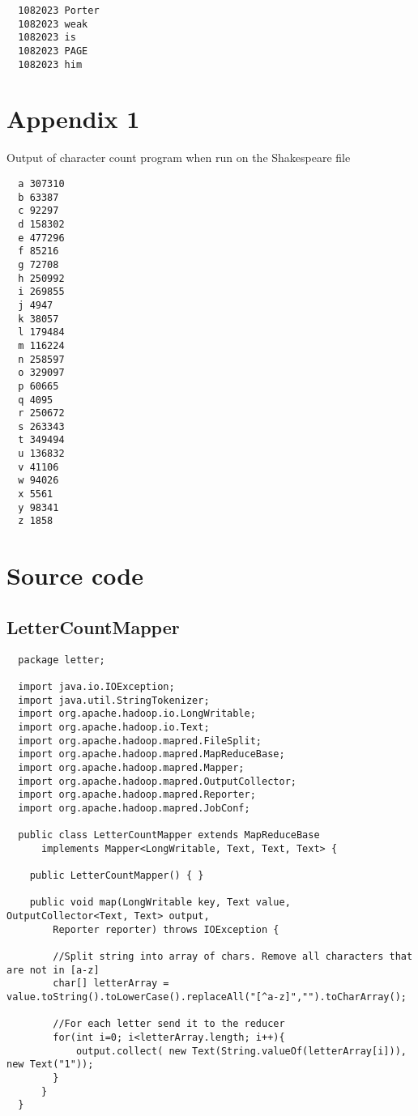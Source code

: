 \documentclass[10pt, a4paper]{article}
\begin{document}
\begin{verbatim}
  1082023 Porter
  1082023 weak
  1082023 is
  1082023 PAGE
  1082023 him
\end{verbatim}


\newpage
\section*{Appendix 1} %
\label{sec:appendix_1}
Output of character count program when run on the Shakespeare file
\begin{verbatim}
  a	307310
  b	63387
  c	92297
  d	158302
  e	477296
  f	85216
  g	72708
  h	250992
  i	269855
  j	4947
  k	38057
  l	179484
  m	116224
  n	258597
  o	329097
  p	60665
  q	4095
  r	250672
  s	263343
  t	349494
  u	136832
  v	41106
  w	94026
  x	5561
  y	98341
  z	1858
\end{verbatim}


\newpage
\section{Source code} %

\subsection{LetterCountMapper} %
\label{sub:lettercountmapper}
\begin{lstlisting}
  package letter;

  import java.io.IOException;
  import java.util.StringTokenizer;
  import org.apache.hadoop.io.LongWritable;
  import org.apache.hadoop.io.Text;
  import org.apache.hadoop.mapred.FileSplit;
  import org.apache.hadoop.mapred.MapReduceBase;
  import org.apache.hadoop.mapred.Mapper;
  import org.apache.hadoop.mapred.OutputCollector;
  import org.apache.hadoop.mapred.Reporter;
  import org.apache.hadoop.mapred.JobConf;

  public class LetterCountMapper extends MapReduceBase
      implements Mapper<LongWritable, Text, Text, Text> {

    public LetterCountMapper() { }

    public void map(LongWritable key, Text value, OutputCollector<Text, Text> output,
        Reporter reporter) throws IOException {

  	    //Split string into array of chars. Remove all characters that are not in [a-z]  
  	    char[] letterArray = value.toString().toLowerCase().replaceAll("[^a-z]","").toCharArray();

  	    //For each letter send it to the reducer
  	    for(int i=0; i<letterArray.length; i++){
  	    	output.collect( new Text(String.valueOf(letterArray[i])), new Text("1"));
  	    }
  	  }
  }
\end{lstlisting}
\end{document}
